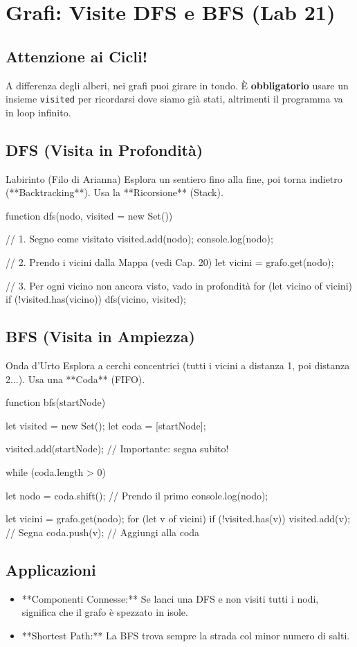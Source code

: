 \section{Grafi: Visite DFS e BFS (Lab 21)}

\subsection{Attenzione ai Cicli!}
A differenza degli alberi, nei grafi puoi girare in tondo.
È \textbf{obbligatorio} usare un insieme \texttt{visited} per ricordarsi dove siamo già stati, altrimenti il programma va in loop infinito.

\subsection{DFS (Visita in Profondità)}
\begin{concept}{Labirinto (Filo di Arianna)}
Esplora un sentiero fino alla fine, poi torna indietro (**Backtracking**).
Usa la **Ricorsione** (Stack).
\end{concept}
\begin{jsbox}
function dfs(nodo, visited = new Set()) {
    // 1. Segno come visitato
    visited.add(nodo);
    console.log(nodo);
    
    // 2. Prendo i vicini dalla Mappa (vedi Cap. 20)
    let vicini = grafo.get(nodo);
    
    // 3. Per ogni vicino non ancora visto, vado in profondità
    for (let vicino of vicini) {
        if (!visited.has(vicino)) {
            dfs(vicino, visited);
        }
    }
}
\end{jsbox}

\subsection{BFS (Visita in Ampiezza)}
\begin{concept}{Onda d'Urto}
Esplora a cerchi concentrici (tutti i vicini a distanza 1, poi distanza 2...).
Usa una **Coda** (FIFO).
\end{concept}
\begin{jsbox}
function bfs(startNode) {
    let visited = new Set();
    let coda = [startNode];
    
    visited.add(startNode); // Importante: segna subito!
    
    while (coda.length > 0) {
        let nodo = coda.shift(); // Prendo il primo
        console.log(nodo);
        
        let vicini = grafo.get(nodo);
        for (let v of vicini) {
            if (!visited.has(v)) {
                visited.add(v); // Segna
                coda.push(v);   // Aggiungi alla coda
            }
        }
    }
}
\end{jsbox}

\subsection{Applicazioni}
\begin{itemize}
    \item **Componenti Connesse:** Se lanci una DFS e non visiti tutti i nodi, significa che il grafo è spezzato in isole.
    \item **Shortest Path:** La BFS trova sempre la strada col minor numero di salti.
\end{itemize}

